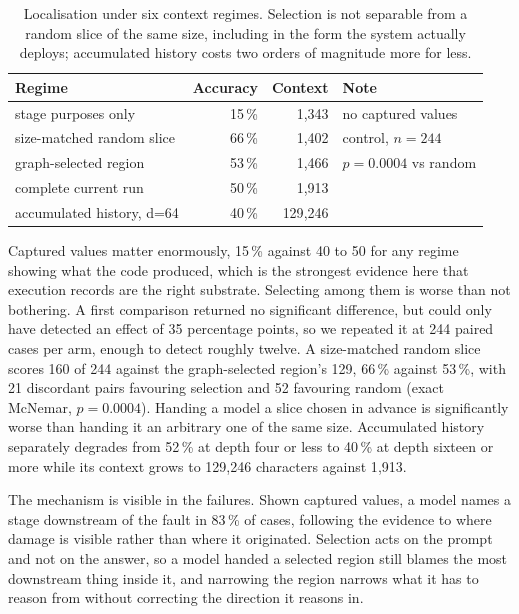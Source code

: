 \begin{table}[t]
\centering
\begin{tabular}{lrrl}
\toprule
Regime & Accuracy & Context & Note \\
\midrule
stage purposes only        & 15\,\% & 1{,}343 & no captured values \\
size-matched random slice  & 66\,\% & 1{,}402 & control, $n{=}244$ \\
graph-selected region      & 53\,\% & 1{,}466 & $p=0.0004$ vs random \\
complete current run       & 50\,\% & 1{,}913 & \\
accumulated history, d=64  & 40\,\% & 129{,}246 & \\
\bottomrule
\end{tabular}
\caption{Localisation under six context regimes. Selection is not separable from a random
slice of the same size, including in the form the system actually deploys; accumulated
history costs two orders of magnitude more for less.}
\label{tab:context}
\end{table}

Captured values matter enormously, 15\,\% against 40 to 50 for any regime showing what the
code produced, which is the strongest evidence here that execution records are the right
substrate. Selecting among them is worse than not bothering. A first comparison returned no
significant difference, but could only have detected an effect of 35 percentage points, so
we repeated it at 244 paired cases per arm, enough to detect roughly twelve. A size-matched
random slice scores 160 of 244 against the graph-selected region's 129, 66\,\% against
53\,\%, with 21 discordant pairs favouring selection and 52 favouring random (exact
McNemar, $p=0.0004$). Handing a model a slice chosen in advance is significantly worse than
handing it an arbitrary one of the same size. Accumulated history separately degrades from
52\,\% at depth four or less to 40\,\% at depth sixteen or more while its context grows to
129{,}246 characters against 1{,}913.

The mechanism is visible in the failures. Shown captured values, a model names a stage
downstream of the fault in 83\,\% of cases, following the evidence to where damage is
visible rather than where it originated. Selection acts on the prompt and not on the
answer, so a model handed a selected region still blames the most downstream thing inside
it, and narrowing the region narrows what it has to reason from without correcting the
direction it reasons in.

